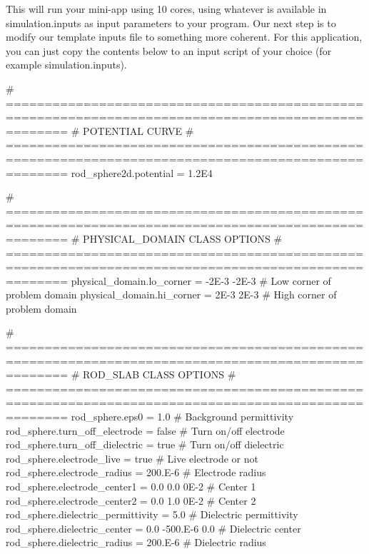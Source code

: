 This will run your mini-\/app using 10 cores, using whatever is available in \textquotesingle{}simulation.\+inputs\textquotesingle{} as input parameters to your program. Our next step is to modify our template inputs file to something more coherent. For this application, you can just copy the contents below to an input script of your choice (for example simulation.\+inputs). \begin{DoxyVerb}  # ====================================================================================================
  # POTENTIAL CURVE
  # ====================================================================================================
  rod_sphere2d.potential = 1.2E4

  # ====================================================================================================
  # PHYSICAL_DOMAIN CLASS OPTIONS
  # ====================================================================================================
  physical_domain.lo_corner = -2E-3 -2E-3    # Low corner of problem domain
  physical_domain.hi_corner =  2E-3  2E-3    # High corner of problem domain

  # ====================================================================================================
  # ROD_SLAB CLASS OPTIONS
  # ====================================================================================================
  rod_sphere.eps0                      = 1.0                              # Background permittivity
  rod_sphere.turn_off_electrode        = false                            # Turn on/off electrode
  rod_sphere.turn_off_dielectric       = true                             # Turn on/off dielectric
  rod_sphere.electrode_live            = true                             # Live electrode or not
  rod_sphere.electrode_radius          = 200.E-6                          # Electrode radius
  rod_sphere.electrode_center1         = 0.0 0.0 0E-2                     # Center 1
  rod_sphere.electrode_center2         = 0.0 1.0 0E-2                     # Center 2
  rod_sphere.dielectric_permittivity   = 5.0                              # Dielectric permittivity
  rod_sphere.dielectric_center         = 0.0 -500.E-6 0.0                 # Dielectric center
  rod_sphere.dielectric_radius         = 200.E-6                         # Dielectric radius


\end{DoxyVerb}

